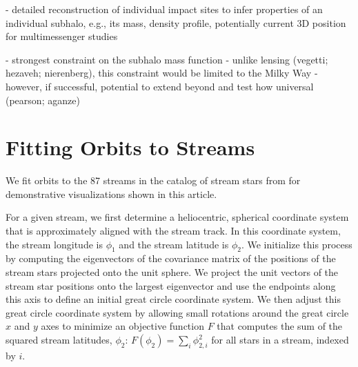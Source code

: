 \documentclass[final,5p,times,twocolumn,authoryear]{elsarticle}
\begin{document}
- detailed reconstruction of individual impact sites to infer properties of an individual subhalo, e.g., its mass, density profile, potentially current 3D position for multimessenger studies



- strongest constraint on the subhalo mass function
- unlike lensing (vegetti; hezaveh; nierenberg), this constraint would be limited to the Milky Way
- however, if successful, potential to extend beyond and test how universal (pearson; aganze)

\appendix

\section{Fitting Orbits to Streams}
\label{apx:stream-fit}

%

We fit orbits to the 87 streams in the catalog of stream stars from \citet{ibata:TODO}
for demonstrative visualizations shown in this article.

For a given stream, we first determine a heliocentric, spherical coordinate system that
is approximately aligned with the stream track.
In this coordinate system, the stream longitude is $\phi_1$ and the stream latitude is
$\phi_2$.
We initialize this process by computing the eigenvectors of the covariance matrix of the
positions of the stream stars projected onto the unit sphere.
We project the unit vectors of the stream star positions onto the largest eigenvector
and use the endpoints along this axis to define an initial great circle coordinate
system.
We then adjust this great circle coordinate system by allowing small rotations around
the great circle $x$ and $y$ axes to minimize an objective function $F$ that computes
the sum of the squared stream latitudes, $\phi_2$: $F(\phi_2) = \sum_i \phi_{2,i}^2$ for
all stars in a stream, indexed by $i$.
\end{document}
